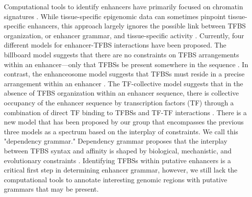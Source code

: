 Computational tools to identify enhancers have primarily focused on chromatin signatures \cite{meuleman2020,zinzen2009}. While tissue-specific epigenomic data can sometimes pinpoint tissue-specific enhancers, this approach largely ignores the possible link between TFBS organization, or enhancer grammar, and tissue-specific activity \cite{jindal2021,grossman2017,ryan2020,king2020a,halfon2019}. Currently, four different models for enhancer-TFBS interactions have been proposed. The billboard model suggests that there are no constraints on TFBS arrangements within an enhancer—only that TFBSs be present somewhere in the sequence \cite{liu2012a,kulkarni2003,jindal2021}. In contrast, the enhanceosome model suggests that TFBSs must reside in a precise arrangement within an enhancer \cite{bazett-jones1994,thanos1995,panne2007,melnikov2012,jindal2021}. The TF-collective model suggests that in the absence of TFBS organization within an enhancer sequence, there is collective occupancy of the enhancer sequence by transcription factors (TF) through a combination of direct TF binding to TFBSs and TF-TF interactions \cite{junion2012,jindal2021}. There is a new model that has been proposed by our group that encompasses the previous three models as a spectrum based on the interplay of constraints. We call this "dependency grammar." Dependency grammar proposes that the interplay between TFBS syntax and affinity is shaped by biological, mechanistic, and evolutionary constraints \cite{jindal2021}. Identifying TFBSs within putative enhancers is a critical first step in determining enhancer grammar, however, we still lack the computational tools to annotate interesting genomic regions with putative grammars that may be present. 

